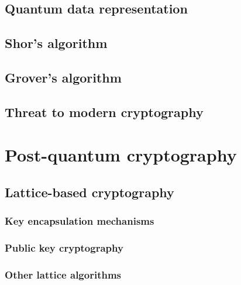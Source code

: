 \section{Quantum data representation}
\label{sec:quantum_data_repr}


\section{Shor's algorithm}
\label{sec:shors_algorithm}


\section{Grover's algorithm}
\label{sec:grovers_alg}


\section{Threat to modern cryptography}
\label{sec:threat_to_modern}


\chapter{Post-quantum cryptography}
\label{ch:pq_crypto}


\section{Lattice-based cryptography}
\label{sec:lattice_based_crypto}


\subsection{Key encapsulation mechanisms}
\label{sec:lattice_kem}


\subsection{Public key cryptography}
\label{sec:lattice_pub_key}


\subsection{Other lattice algorithms}
\label{sec:lattice_other}


